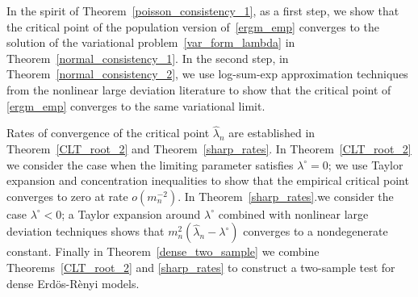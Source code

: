 \documentclass[12pt]{article}
\def\er{ Erd{\"o}s-R{\`e}nyi }
\numberwithin{equation}{section}
\begin{document}
In the spirit of
    Theorem~\ref{poisson_consistency_1}, as a first step, we show that the critical point of the population version
    of~\eqref{ergm_emp} converges to the solution of the variational problem~\eqref{var_form_lambda} in Theorem~\ref{normal_consistency_1}.  In the second step, in Theorem~\ref{normal_consistency_2}, we use log-sum-exp approximation techniques from
    the nonlinear large deviation literature to show that the critical point of
    \eqref{ergm_emp} converges to the same variational limit.

    
    Rates of convergence of the critical point $\hat{\lambda}_n$ are established in Theorem~\ref{CLT_root_2} and Theorem~\ref{sharp_rates}.
   In Theorem~\ref{CLT_root_2} we consider the case when the limiting parameter satisfies
    $\lambda^{\circ}=0$; we use Taylor expansion and concentration inequalities to show that the
    empirical critical point converges to zero at rate $o(m_n^{-2})$.
    In Theorem~\ref{sharp_rates}.we consider the case $\lambda^{\circ}<0$; a Taylor expansion around
    $\lambda^{\circ}$ combined with nonlinear large deviation techniques shows that
    $m_n^2(\hat{\lambda}_n-\lambda^{\circ})$ converges to a nondegenerate constant.
    Finally in Theorem~\ref{dense_two_sample} we combine Theorems~\ref{CLT_root_2} and
    \ref{sharp_rates} to construct a two-sample test for dense \er models.
\end{document}
